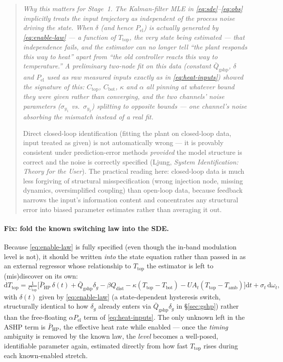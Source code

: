 \documentclass[11pt,a4paper]{article}
\newcommand{\Ttop}{T_{\mathrm{top}}}
\newcommand{\Tbot}{T_{\mathrm{bot}}}
\newcommand{\Tamb}{T_{\mathrm{amb}}}
\newcommand{\Pel}{P_{\mathrm{el}}}
\begin{document}
\begin{quote}\small\itshape
Why this matters for Stage~1. The Kalman-filter MLE in \eqref{eq:sde}--\eqref{eq:obs}
implicitly treats the input trajectory as independent of the process noise
driving the state. When $\delta$ (and hence $\Pel$) is actually generated by
\eqref{eq:enable-law} --- a function of $\Ttop$, the very state being
estimated --- that independence fails, and the estimator can no longer tell
``the plant responds this way to heat'' apart from ``the old controller reacts
this way to temperature.'' A preliminary two-node fit on this data (constant
$\bar Q_{\mathrm{gshp}}$, $\delta$ and $\Pel$ used as raw measured inputs
exactly as in \eqref{eq:heat-inputs}) showed the signature of this: $C_{\mathrm{top}}$,
$C_{\mathrm{bot}}$, $\kappa$ and $\alpha$ all pinning at whatever bound they
were given rather than converging, and the two channels' noise parameters
($\sigma_{y_1}$ vs.\ $\sigma_{y_2}$) splitting to opposite bounds --- one
channel's noise absorbing the mismatch instead of a real fit.

Direct closed-loop identification (fitting the plant on closed-loop data,
input treated as given) is not automatically wrong --- it is provably
consistent under prediction-error methods \emph{provided} the model structure
is correct and the noise is correctly specified (Ljung, \emph{System
Identification: Theory for the User}). The practical reading here: closed-loop
data is much less forgiving of structural misspecification (wrong injection
node, missing dynamics, oversimplified coupling) than open-loop data, because
feedback narrows the input's information content and concentrates any
structural error into biased parameter estimates rather than averaging it out.
\end{quote}

\paragraph{Fix: fold the known switching law into the SDE.}
Because \eqref{eq:enable-law} is fully specified (even though the in-band
modulation level is not), it should be written \emph{into} the state equation
rather than passed in as an external regressor whose relationship to $\Ttop$
the estimator is left to (mis)discover on its own:
\begin{equation}
  \mathrm d\Ttop = \tfrac{1}{C_{\mathrm{top}}}\Big[
      \bar P_{\mathrm{HP}}\,\delta(t) + \bar Q_{\mathrm{gshp}}\delta_g
      - \beta Q_{\mathrm{dist}} - \kappa(\Ttop-\Tbot) - UA_t(\Ttop-\Tamb)\Big]\mathrm dt
      + \sigma_t\,\mathrm d\omega_t,
  \label{eq:sde-top-switched}
\end{equation}
with $\delta(t)$ given by \eqref{eq:enable-law} (a state-dependent hysteresis
switch, structurally identical to how $\delta_g$ already enters via
$\bar Q_{\mathrm{gshp}}\delta_g$ in \S\ref{sec:gshp}) rather than the
free-floating $\alpha\Pel$ term of \eqref{eq:heat-inputs}. The only unknown
left in the ASHP term is $\bar P_{\mathrm{HP}}$, the effective heat rate while
enabled --- once the \emph{timing} ambiguity is removed by the known law, the
\emph{level} becomes a well-posed, identifiable parameter again, estimated
directly from how fast $\Ttop$ rises during each known-enabled stretch.
\end{document}
